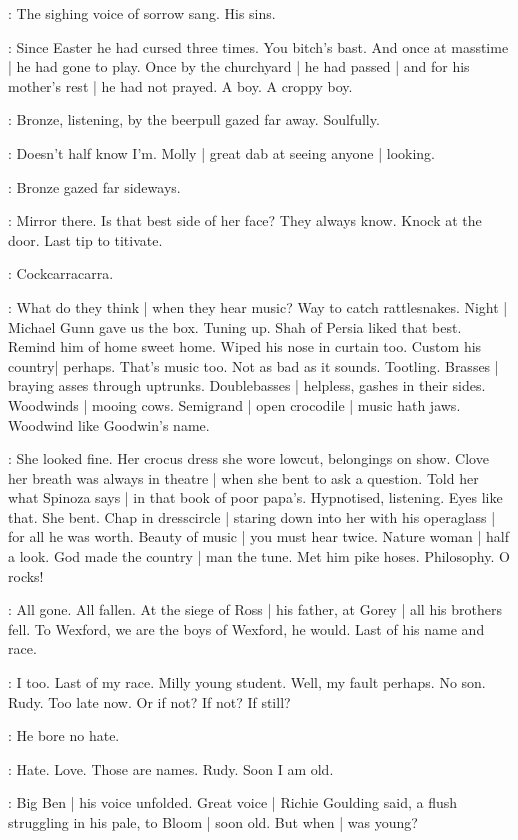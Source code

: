 :
The sighing voice of sorrow sang.
His sins.

:
Since Easter he had
cursed three times.
You bitch's bast.
And once at masstime |
he had gone to play.
Once by the churchyard |
he had passed |
and for his mother's rest |
he had not prayed.
A boy.
A croppy boy.

:
Bronze,
listening,
by the beerpull gazed far away.
Soulfully.

\BloomInt:
Doesn't half know I'm.
Molly |
great dab at seeing anyone |
looking.

:
Bronze gazed far sideways.

\BloomInt:
Mirror there.
Is that best side of her face?
They always know.
Knock at the door.
Last tip to titivate.

\BloomInt:
Cockcarracarra.

\BloomInt:
What do they think |
when they hear music?
Way to catch rattlesnakes.
Night |
Michael Gunn gave us the box.
Tuning up.
Shah of Persia liked that best.
Remind him of home sweet home.
Wiped his nose in curtain too.
Custom his country|
perhaps.
That's music too.
Not as bad as it sounds.
Tootling.
Brasses |
braying asses through uptrunks.
Doublebasses |
helpless,
gashes in their sides.
Woodwinds |
mooing cows.
Semigrand |
open crocodile |
music hath jaws.
Woodwind like Goodwin's name.

\BloomInt:
She looked fine.
Her crocus dress she wore lowcut,
belongings on show.
Clove her breath was always in theatre |
when she bent to ask a question.
Told her what Spinoza says |
in that book of poor papa's.
Hypnotised,
listening.
Eyes like that.
She bent.
Chap in dresscircle |
staring down into her with his operaglass |
for all he was worth.
Beauty of music |
you must hear twice.
Nature woman |
half a look.
God made the country |
man the tune.
Met him pike hoses.
Philosophy.
O rocks!

:
All gone.
All fallen.
At the siege of Ross |
his father,
at Gorey |
all his brothers fell.
To Wexford,
we are the boys of Wexford,
he would.
Last of his name and race.

\BloomInt:
I too.
Last of my race.
Milly young student.
Well,
my fault perhaps.
No son.
Rudy.
Too late now.
Or if not?
If not?
If still?

:
He bore no hate.

\BloomInt:
Hate.
Love.
Those are names.
Rudy.
Soon I am old.

:
Big Ben |
his voice unfolded.
Great voice |
Richie Goulding said,
a flush struggling in his pale,
to Bloom |
soon old.
But when |
was young?

